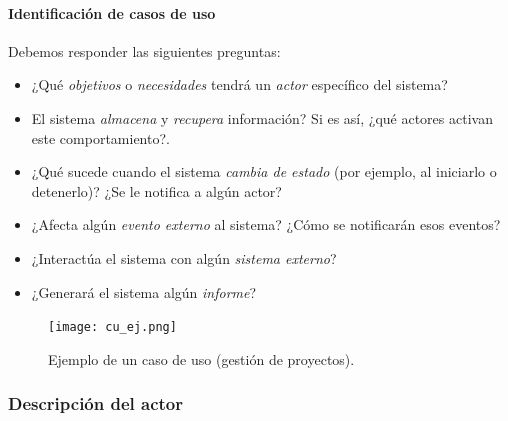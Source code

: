 \documentclass[12pt,spanish]{article}
\begin{document}
\paragraph{Identificación de casos de uso}

Debemos responder las siguientes preguntas:

\begin{itemize}
	\item ¿Qué \emph{objetivos} o \emph{necesidades} tendrá un \emph{actor} específico del sistema?
	\item El sistema \emph{almacena} y \emph{recupera} información? Si es así, ¿qué actores activan este comportamiento?.
	\item ¿Qué sucede cuando el sistema \emph{cambia de estado} (por ejemplo, al iniciarlo o detenerlo)? ¿Se le notifica a algún actor?
	\item ¿Afecta algún \emph{evento externo} al sistema? ¿Cómo se notificarán esos eventos?
	\item ¿Interactúa el sistema con algún \emph{sistema externo}?
	\item ¿Generará el sistema algún \emph{informe}?
\end{itemize}

\begin{figure}[H]
	\centering
	\texttt{[image: cu\_ej.png]}
	\caption{Ejemplo de un caso de uso (gestión de proyectos).}
\end{figure}
\newpage
\subsubsection{Descripción del actor}
\end{document}
